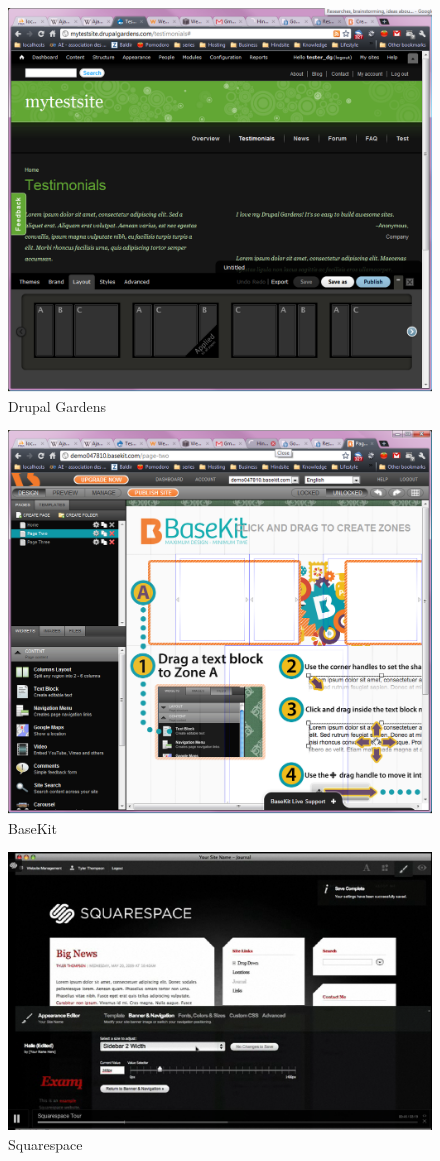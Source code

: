 \begin{figure}[!ht]
\centering
\includegraphics[width=.55\textwidth]{img/drupal_gardens.png}
\caption{Drupal Gardens}
\label{figure:drupal_gardens}
\end{figure}

\begin{figure}[!ht]
\centering
\includegraphics[width=.55\textwidth]{img/basekit.png}
\caption{BaseKit}
\label{figure:basekit}
\end{figure}

\begin{figure}[!ht]
\centering
\includegraphics[width=.55\textwidth]{img/squarespace.png}
\caption{Squarespace}
\label{figure:squarespace}
\end{figure}

